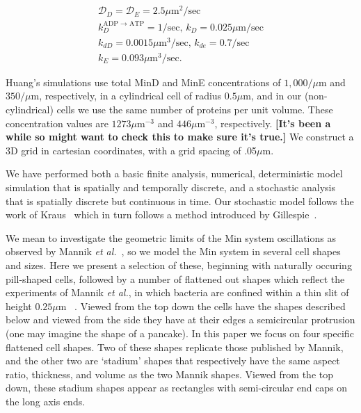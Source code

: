 \documentclass[letterpaper,twocolumn,amsmath,amssymb,pre]{revtex4-1}
\newcommand{\red}[1]{{\bf \color{red} #1}}
\newcommand{\fixme}[1]{\red{[#1]}}
\newcommand\micron{\ensuremath{\mu\text{m}}}
\begin{document}
\begin{gather*}
  \mathcal{D}_D = \mathcal{D}_{E} = 2.5\micron^2/\text{sec}\\
  k_D^{\textrm{ADP $\rightarrow$ ATP}} = 1/\textrm{sec,  }
  k_D = 0.025 \micron /\textrm{sec}\\
  k_{dD} = 0.0015 \micron^3/ \textrm{sec,  }
  k_{de} = 0.7/\textrm{sec}\\
  k_E = 0.093 \micron^3 /\textrm{sec}.
\end{gather*}

Huang's simulations use total MinD and MinE concentrations of
$1,000/\micron$ and $350/\micron$, respectively, in a cylindrical cell of
radius $0.5\micron$, and in our (non-cylindrical) cells we use the same
number of proteins per unit volume.  These concentration values are
$1273\micron^{-3}$ and $446\micron^{-3}$, respectively. \fixme{It's been
  a while so might want to check this to make sure it's true.}  We
construct a 3D grid in cartesian coordinates, with a grid spacing of
.05\micron.

We have performed both a basic finite analysis, numerical,
deterministic model simulation that is spatially and temporally
discrete, and a stochastic analysis that is spatially discrete but
continuous in time.  Our stochastic model follows the work of
Kraus~\cite{kraus1996crosstalk} which in turn follows a method
introduced by Gillespie~\cite{gillespie1977exact}.

We mean to investigate the geometric limits of the Min system
oscillations as observed by Mannik \emph{et
  al.}~\cite{mannik2012robustness}, so we model the Min system in
several cell shapes and sizes.  Here we present a selection of these,
beginning with naturally occuring pill-shaped cells, followed by a
number of flattened out shapes which reflect the experiments of Mannik
\emph{et al.}, in which bacteria are confined within a thin slit of
height $0.25\micron$ ~\cite{mannik2012robustness}.  Viewed from the
top down the cells have the shapes described below and viewed from the
side they have at their edges a semicircular protrusion (one may
imagine the shape of a pancake).
%
In this paper we focus on four specific flattened cell shapes.  Two of
these shapes replicate those published by Mannik, and the other two
are `stadium' shapes that respectively have the same aspect ratio,
thickness, and volume as the two Mannik shapes.  Viewed from the top
down, these stadium shapes appear as rectangles with semi-circular end
caps on the long axis ends.

\end{document}
